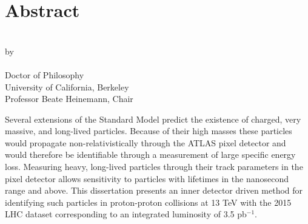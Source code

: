 


\begingroup
\let\clearpage\relax
\let\cleardoublepage\relax
\let\cleardoublepage\relax

\chapter*{Abstract}

\begin{center}
\myTitle \\ \bigskip
by \\ \bigskip
\myName \\ \bigskip
Doctor of Philosophy \\ \smallskip
University of California, Berkeley \\ \smallskip
Professor Beate Heinemann, Chair \\
\end{center}

\vspace{2cm}

\noindent Several extensions of the Standard Model predict the existence of charged, very massive, and long-lived particles. Because of their high masses these particles would propagate non-relativistically through the ATLAS pixel detector and would therefore be identifiable through a measurement of large specific energy loss. Measuring heavy, long-lived particles through their track parameters in the pixel detector allows sensitivity to particles with lifetimes in the nanosecond range and above. This dissertation presents an inner detector driven method for identifying such particles in proton-proton collisions at 13 TeV with the 2015 \acs*{LHC} dataset corresponding to an integrated luminosity of 3.5 pb$^{-1}$.
\endgroup			

\vfill
